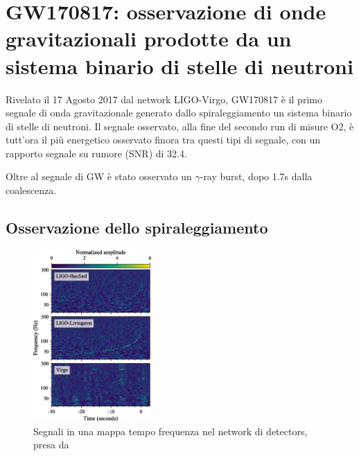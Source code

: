 
\chapter[Osservazione di GW da BNS]{GW170817: osservazione di onde gravitazionali prodotte da un sistema binario di stelle di neutroni}
\label{chapter:gw170817}
Rivelato il 17 Agosto 2017 dal network LIGO-Virgo, GW170817 è il primo segnale di onda gravitazionale generato dallo spiraleggiamento un sistema binario di stelle di neutroni.
Il segnale osservato, alla fine del secondo run di misure O2, è tutt'ora il più energetico osservato finora tra questi tipi di segnale, con un rapporto segnale su rumore (SNR) di 32.4.

Oltre al segnale di GW è stato osservato un $\gamma$-ray burst, dopo 1.7s dalla coalescenza.

\section{Osservazione dello spiraleggiamento}
\label{section:osservazioneInspiralGW170817}
\begin{figure}
	\vspace{-15pt}
	\begin{center}
		\includegraphics[width=0.4\textwidth]{figures/Capitolo_2/gw170817_time_freq.png}
	\end{center}
	\vspace{-10pt}
	\caption{Segnali in una mappa tempo frequenza nel network di detectors, presa da \cite{Abbott_2017b}}
	\label{fig:osservazione_gw170817}
	\vspace{-40pt}
\end{figure}

